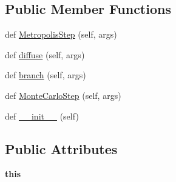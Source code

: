\subsection*{Public Member Functions}
\begin{DoxyCompactItemize}
\item 
def \hyperlink{classMontePython__cxx_1_1MCpp_a8aa4c063732148f80bdbc85221928d2d}{Metropolis\+Step} (self, args)
\item 
def \hyperlink{classMontePython__cxx_1_1MCpp_a24bfc557bef0e6f19a50e0733e80d876}{diffuse} (self, args)
\item 
def \hyperlink{classMontePython__cxx_1_1MCpp_ab00dcec7dcd2577cdea3a198e69b40d8}{branch} (self, args)
\item 
def \hyperlink{classMontePython__cxx_1_1MCpp_a83b51d1d42219d0819d009569bfc2088}{Monte\+Carlo\+Step} (self, args)
\item 
def \hyperlink{classMontePython__cxx_1_1MCpp_a0fc96c503fb9e3bbae6c7e753ba625ea}{\+\_\+\+\_\+init\+\_\+\+\_\+} (self)
\end{DoxyCompactItemize}
\subsection*{Public Attributes}
\begin{DoxyCompactItemize}
\item 
\hypertarget{classMontePython__cxx_1_1MCpp_a7d33ee67eb42b87de34487219ae5441a}{}{\bfseries this}\label{classMontePython__cxx_1_1MCpp_a7d33ee67eb42b87de34487219ae5441a}

\end{DoxyCompactItemize}

